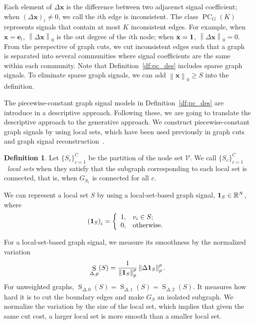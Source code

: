 \documentclass[journal,twocolumn,10pt]{IEEEtran}
\theoremstyle{definition}
\newtheorem{defn}{Definition}
\newcommand{\R}{\ensuremath{\mathbb{R}}}
\def\x{\mathbf{x}}
\def\e{\mathbf{e}}
\def\V{\mathcal{V}}
\DeclareMathOperator{\PC}{PC}
\DeclareMathOperator{\STV}{S}
\begin{document}
Each element of $\Delta \x$ is the difference between two adjacenct signal coefficient; when $\left( \Delta \x \right)_i \neq 0$, we call the $i$th edge is inconsistent. The class $\PC_{G}(K)$ represents signals that contain at most $K$ inconsistent edges. For example, when $\x = \e_i$, $\left\| \Delta \x  \right\|_0$ is the out degree of the $i$th node; when $\x = {\bf 1}$, $\left\| \Delta \x  \right\|_0 = 0$. From the perspective of graph cuts, we cut inconsistent edges such that a graph is separated into several communities where signal coefficients are the same within each community. Note that Definition~\ref{df:pc_des} includes sparse graph signals. To eliminate sparse graph signals, we can add $\left\| \x \right\|_0 \geq S$ into the definition. 


The piecewise-constant graph signal models in Definition~\ref{df:pc_des}  are introduce in a descriptive approach. Following these, we are going to translate the descriptive approach to the generative approach. We construct piecewise-constant graph signals by using local sets, which have
been used previously in graph cuts and graph signal
reconstruction~\cite{Luxburg:07, WangLG:14}.
\begin{defn}
  \label{df:localset}
  Let $\{S_c\}_{c=1}^C$ be the partition of the node set $\V$. We call $\{S_c\}_{c=1}^C$~\emph{local sets} when they satisfy that the subgraph corresponding to each local set is connected, that is, when $G_{S_c}$ is connected for all $c$.
\end{defn}

We can represent a local set $S$ by using a local-set-based graph signal, ${\bf 1}_{S} \in \R^N$, where
\begin{equation*}
\left(  {\bf 1}_{S}  \right)_i = 
  \left\{ 
    \begin{array}{rl}
      1, & v_i \in S;\\
      0, & \mbox{otherwise}.
  \end{array} \right.
\end{equation*}

For a local-set-based graph signal, we measure its smoothness by the normalized variation
$$
\STV_{\Delta, p} (S) = \frac{1}{\left\|  {\bf 1}_S  \right\|_p^p}\left\| \Delta {\bf 1}_S \right\|_p^p.
$$
For unweighted graphs, $\STV_{\Delta, 0} (S) = \STV_{\Delta, 1}(S) = \STV_{\Delta, 2} (S)$. It measures how hard it is to cut the boundary edges and make $G_S$ an isolated subgraph. We normalize the variation by the size of the local set, which implies that given the same cut cost, a larger local set is more smooth than a smaller local set.
\end{document}
